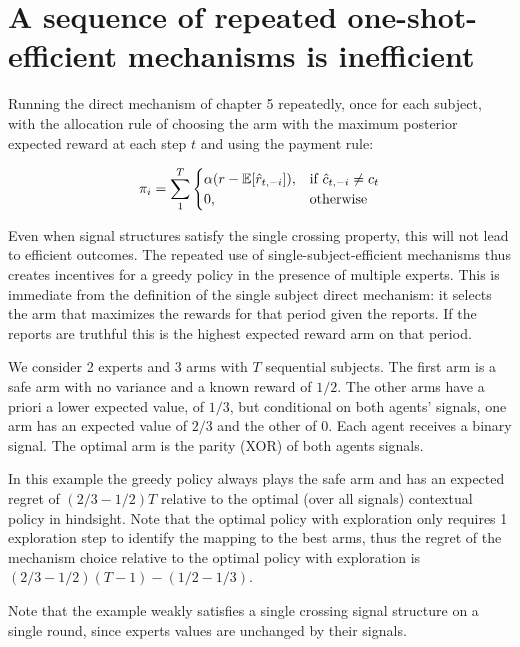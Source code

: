 \section{A sequence of repeated one-shot-efficient mechanisms is inefficient}

Running the direct mechanism of chapter 5 repeatedly, once for each subject, with the allocation rule of choosing the arm with the maximum posterior expected reward at each step $t$ and using the payment rule:

\[
    \pi_i = \sum_1^T 
\begin{cases}
    \alpha (r - \expec[\hat{r}_{t,-i}]) ,& \text{if } \hat{c}_{t,-i} \neq c_t\\
    0,              & \text{otherwise}
\end{cases}
\]

Even when signal structures satisfy the single crossing property, this will not lead to efficient outcomes.
The repeated use of single-subject-efficient mechanisms thus creates incentives for a greedy policy in the presence of multiple experts.
This is immediate from the definition of the single subject direct mechanism: it selects the arm that maximizes the rewards for that period given the reports. If the reports are truthful this is the highest expected reward arm on that period.


\begin{eg}\label{eg:2regimes}
We consider 2 experts and 3 arms with $T$ sequential subjects. The first arm is a safe arm with no variance and a known reward of $1/2$. The other arms have a priori a lower expected value, of $1/3$, but conditional on both agents' signals, one arm has an expected value of $2/3$ and the other of $0$. 
Each agent receives a binary signal. The optimal arm is the parity (XOR) of both agents signals. 
\end{eg}

In this example the greedy policy always plays the safe arm and has an expected regret of $(2/3 - 1/2)T$ relative to the optimal (over all signals) contextual policy in hindsight.
Note that the optimal policy with exploration only requires 1 exploration step to identify the mapping to the best arms, thus the regret of the mechanism choice  relative to the optimal policy with exploration is $(2/3 - 1/2)(T-1) - (1/2-1/3)$. 

Note that the example weakly satisfies a single crossing signal structure on a single round, since experts values are unchanged by their signals.

